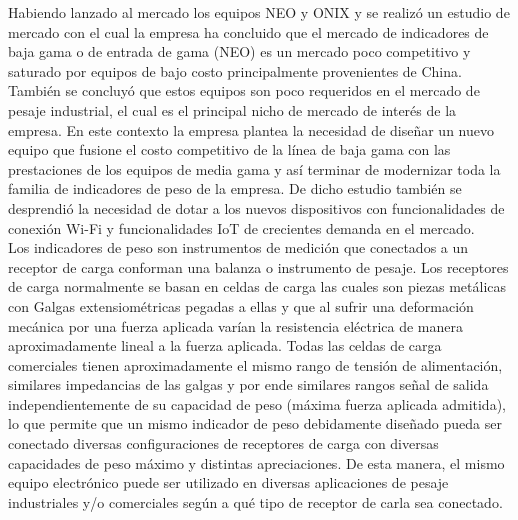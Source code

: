\documentclass[11pt]{charter}
\begin{document}
Habiendo lanzado al mercado los equipos NEO y ONIX y se realizó un estudio de mercado con el cual la empresa ha concluido que el mercado de indicadores de baja gama o de entrada de gama (NEO) es un mercado poco competitivo y saturado por equipos de bajo costo principalmente provenientes de China. También se concluyó  que estos equipos son poco requeridos en el mercado de pesaje industrial, el cual es el principal nicho de mercado de interés de la empresa. En este contexto la empresa plantea la necesidad de diseñar un nuevo equipo que fusione el costo competitivo de la línea de baja gama con las prestaciones de los equipos de media gama y así terminar de modernizar toda la familia de indicadores de peso de la empresa. De dicho estudio  también se desprendió la necesidad de dotar a los nuevos dispositivos con funcionalidades de conexión Wi-Fi y funcionalidades IoT de crecientes demanda en el mercado.\\

Los indicadores de peso son instrumentos de medición que conectados a un receptor de carga conforman una balanza o instrumento de pesaje. Los receptores de carga normalmente se basan en celdas de carga las cuales son piezas metálicas con Galgas extensiométricas pegadas a ellas y que al sufrir una deformación mecánica por una fuerza aplicada varían la resistencia eléctrica de manera aproximadamente lineal a la fuerza aplicada. Todas las celdas de carga comerciales tienen aproximadamente el mismo rango de tensión de alimentación, similares impedancias de las galgas y por ende similares rangos señal de salida independientemente de su capacidad de peso (máxima fuerza aplicada admitida), lo que permite que un mismo indicador de peso debidamente diseñado pueda ser conectado diversas configuraciones de receptores de carga con diversas capacidades de peso máximo y distintas apreciaciones. De esta manera, el mismo equipo electrónico puede ser utilizado en diversas aplicaciones de pesaje industriales y/o comerciales según a qué tipo de receptor de carla sea conectado.
\end{document}
